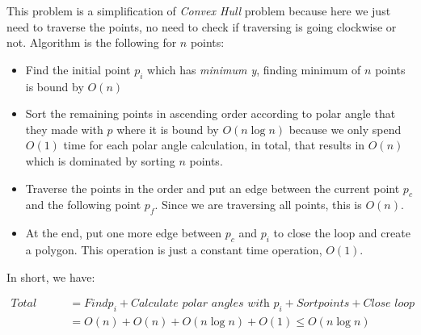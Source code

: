 This problem is a simplification of  \textit{Convex Hull} problem because here we just need to traverse the points, no need to check if traversing is going clockwise or not. Algorithm is the following for $n$ points:
\begin{itemize}
  \item Find the initial point $p_i$ which has \textit{minimum y}, finding minimum of $n$ points is bound by $O(n)$
  \item Sort the remaining points in ascending order according to polar angle that they made with $p$ where it is bound by $O(n \log n)$ because we only spend $O(1)$ time for each  polar angle calculation, in total, that results in $O(n)$ which is dominated by sorting $n$ points.
  \item Traverse the points in the order and put an edge between the current point $p_c$ and the following point $p_f$. Since we are traversing all points, this is $O(n)$.
  \item At the end, put one more edge between $p_c$ and $p_i$ to close the loop and create a polygon. This operation is just a constant time operation, $O(1)$.
\end{itemize}

In short, we have:

\begin{align*}
  \textit{Total Cost} &= Find p_i + \textit{Calculate polar angles with } p_i + Sort points + \textit{Close loop} \\
                      &= O(n) + O(n) + O(n \log n) + O(1) \leq O(n \log n)
\end{align*}